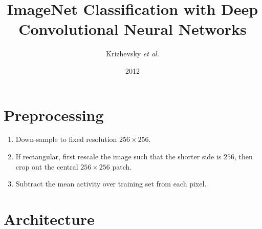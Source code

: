\documentclass[a4paper,12pt]{article}
\title{ImageNet Classification with Deep Convolutional Neural Networks}
\author{Krizhevsky \emph{et al.}}
\date{2012}
\begin{document}
  \maketitle

\section{Preprocessing}

\begin{enumerate}
  \item
  Down-sample to fixed resolution $256 \times 256$.
  \item
  If rectangular, first rescale the image such that the shorter side is $256$, then crop out the central $256 \times 256$ patch.
  \item
  Subtract the mean activity over training set from each pixel.
\end{enumerate}

\section{Architecture}
\end{document}
